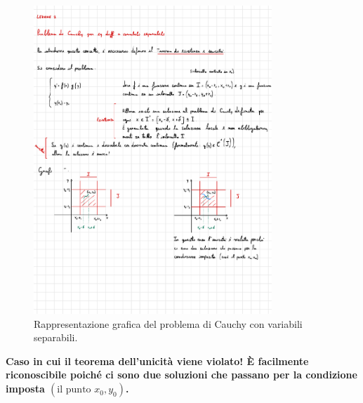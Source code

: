 \documentclass[a4paper]{article}
\begin{document}
	\begin{figure}[!htp]
		\centering
		\includegraphics[width=0.8\textwidth]{img/prob_cauchy-variabili_separabili.pdf}
		\caption{Rappresentazione grafica del problema di Cauchy con variabili separabili.}
	\end{figure}

	\newpage

	\noindent
	\textbf{Caso in cui il teorema dell'unicità viene violato! È facilmente riconoscibile poiché ci sono due soluzioni che passano per la condizione imposta $\left(\text{il punto } x_{0}, y_{0}\right)$.}
	
\end{document}

